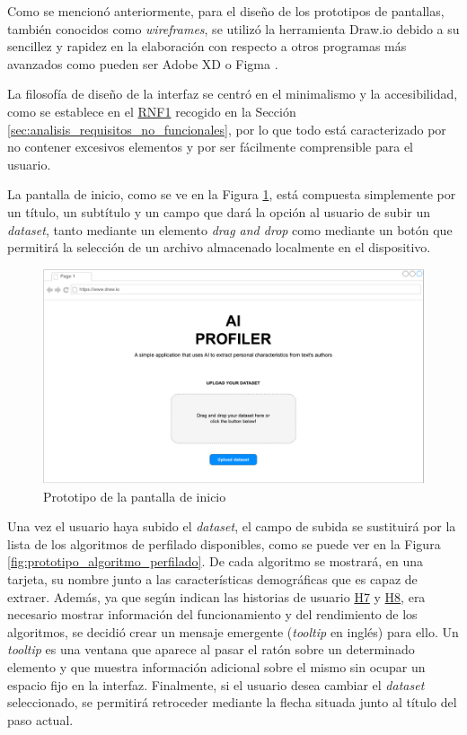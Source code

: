 Como se mencionó anteriormente, para el diseño de los prototipos de pantallas, también conocidos como \textit{wireframes}, se utilizó
la herramienta Draw.io \cite{drawio} debido a su sencillez y rapidez en la elaboración con respecto a otros programas más avanzados
como pueden ser Adobe XD \cite{adobexd} o Figma \cite{figma}.

\bigskip
La filosofía de diseño de la interfaz se centró en el minimalismo y la accesibilidad, como se establece en el \hyperref[req:rnf1]{RNF1}
recogido en la Sección \ref{sec:analisis_requisitos_no_funcionales}, por lo que todo está caracterizado por no contener excesivos elementos y por ser fácilmente comprensible para el usuario.

\bigskip
La pantalla de inicio, como se ve en la Figura \ref{fig:prototipo_inicio}, está compuesta simplemente por un título,
un subtítulo y un campo que dará la opción al usuario de subir un \textit{dataset}, tanto mediante un elemento \textit{drag and drop} como
mediante un botón que permitirá la selección de un archivo almacenado localmente en el dispositivo.

\bigskip
\begin{figure}[H]
	\centering
	\includegraphics[width=\textwidth]{diagramas/landing.pdf}
	\caption{Prototipo de la pantalla de inicio}
	\label{fig:prototipo_inicio}
\end{figure}

\bigskip
Una vez el usuario haya subido el \textit{dataset}, el campo de subida se sustituirá por la lista de los
algoritmos de perfilado disponibles, como se puede ver en la Figura \ref{fig:prototipo_algoritmo_perfilado}. De cada algoritmo se mostrará,
en una tarjeta, su nombre junto a las características demográficas que es capaz de extraer. Además, ya que según indican las historias de usuario \hyperref[req:hu7]{H7} y \hyperref[req:hu8]{H8},
era necesario mostrar información del funcionamiento
y del rendimiento de los algoritmos, se decidió crear un mensaje emergente (\textit{tooltip} en inglés) para ello. Un \textit{tooltip} es una ventana
que aparece al pasar el ratón sobre un determinado elemento y que muestra información adicional sobre el mismo sin ocupar un espacio fijo
en la interfaz. Finalmente, si el usuario desea cambiar el \textit{dataset} seleccionado, se permitirá retroceder mediante
la flecha situada junto al título del paso actual.

